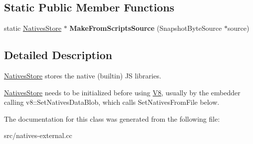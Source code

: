 \subsection*{Static Public Member Functions}
\begin{DoxyCompactItemize}
\item 
\hypertarget{classv8_1_1internal_1_1_natives_store_a66dd253bb883f30455bf975b88f5b961}{}static \hyperlink{classv8_1_1internal_1_1_natives_store}{Natives\+Store} $\ast$ {\bfseries Make\+From\+Scripts\+Source} (Snapshot\+Byte\+Source $\ast$source)\label{classv8_1_1internal_1_1_natives_store_a66dd253bb883f30455bf975b88f5b961}

\end{DoxyCompactItemize}


\subsection{Detailed Description}
\hyperlink{classv8_1_1internal_1_1_natives_store}{Natives\+Store} stores the \textquotesingle{}native\textquotesingle{} (builtin) J\+S libraries.

\hyperlink{classv8_1_1internal_1_1_natives_store}{Natives\+Store} needs to be initialized before using \hyperlink{classv8_1_1internal_1_1_v8}{V8}, usually by the embedder calling v8\+::\+Set\+Natives\+Data\+Blob, which calls Set\+Natives\+From\+File below. 

The documentation for this class was generated from the following file\+:\begin{DoxyCompactItemize}
\item 
src/natives-\/external.\+cc\end{DoxyCompactItemize}
